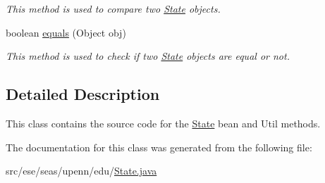 \begin{DoxyCompactItemize}
\begin{DoxyCompactList}\small\item\em This method is used to compare two \hyperlink{classese_1_1seas_1_1upenn_1_1edu_1_1_state}{State} objects. \end{DoxyCompactList}\item 
\hypertarget{classese_1_1seas_1_1upenn_1_1edu_1_1_state_a06e902ef5ac632718ef1742752dcc926}{}boolean \hyperlink{classese_1_1seas_1_1upenn_1_1edu_1_1_state_a06e902ef5ac632718ef1742752dcc926}{equals} (Object obj)\label{classese_1_1seas_1_1upenn_1_1edu_1_1_state_a06e902ef5ac632718ef1742752dcc926}

\begin{DoxyCompactList}\small\item\em This method is used to check if two \hyperlink{classese_1_1seas_1_1upenn_1_1edu_1_1_state}{State} objects are equal or not. \end{DoxyCompactList}\end{DoxyCompactItemize}


\subsection{Detailed Description}
This class contains the source code for the \hyperlink{classese_1_1seas_1_1upenn_1_1edu_1_1_state}{State} bean and Util methods. 

The documentation for this class was generated from the following file\+:\begin{DoxyCompactItemize}
\item 
src/ese/seas/upenn/edu/\hyperlink{_state_8java}{State.\+java}\end{DoxyCompactItemize}
